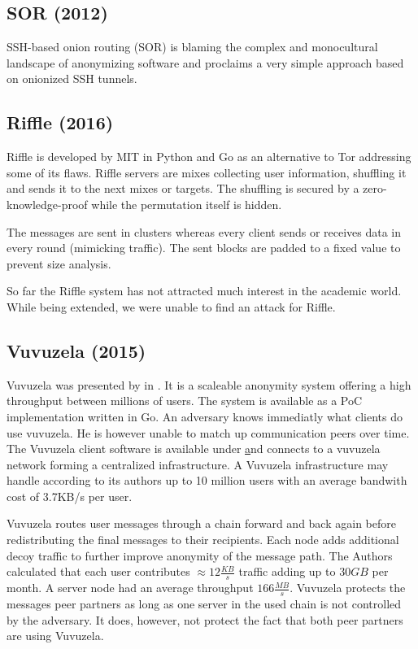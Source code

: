 \subsection{SOR (2012)}
SSH-based onion routing (SOR)\cite{Egners_2012} is blaming the complex and monocultural landscape of anonymizing software and proclaims a very simple approach based on onionized SSH tunnels. 

\subsection{Riffle (2016)}
Riffle\cite{kwon2016riffle} is developed by MIT in Python and Go as an alternative to Tor addressing some of its flaws. Riffle servers are mixes collecting user information, shuffling it and sends it to the next mixes or targets. The shuffling is secured by a zero-knowledge-proof while the permutation itself is hidden.

The messages are sent in clusters whereas every client sends or receives data in every round (mimicking traffic). The sent blocks are padded to a fixed value to prevent size analysis. 

So far the Riffle system has not attracted much interest in the academic world. While being extended, we were unable to find an attack for Riffle.


\subsection{Vuvuzela (2015)}
Vuvuzela was presented by \citeauthor{van2015vuvuzela} in \cite{van2015vuvuzela}. It is a scaleable anonymity system offering a high throughput between millions of users. The system is available as a PoC implementation written in Go. An adversary knows immediatly what clients do use vuvuzela. He is however unable to match up communication peers over time. The Vuvuzela client software is available under \href{https://vuvuzela.io/} and connects to a vuvuzela network forming a centralized infrastructure. A Vuvuzela infrastructure may handle according to its authors up to 10 million users with an average bandwith cost of 3.7KB/s per user.

Vuvuzela routes user messages through a chain forward and back again before redistributing  the final messages to their recipients. Each node adds additional decoy traffic to further improve anonymity of the message path. The Authors calculated that each user contributes $\approx 12 \frac{KB}{s}$ traffic adding up to $30 GB$ per month. A server node had an average throughput $166 \frac{MB}{s}$. Vuvuzela protects the messages peer partners as long as one server in the used chain is not controlled by the adversary. It does, however, not protect the fact that both peer partners are using Vuvuzela. 


